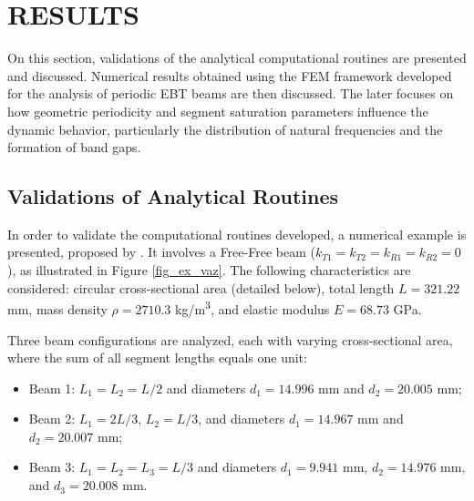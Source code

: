 \section{RESULTS}

On this section, validations of the analytical computational routines are presented and discussed. Numerical results obtained using the FEM framework developed for the analysis of periodic EBT beams are then discussed. The later focuses on how geometric periodicity and segment saturation parameters influence the dynamic behavior, particularly the distribution of natural frequencies and the formation of band gaps.

\subsection{Validations of Analytical Routines}

In order to validate the computational routines developed, a numerical example is presented, proposed by \textcite{vaz2008}. It involves a Free-Free beam ($k_{T1} = k_{T2} = k_{R1} = k_{R2} = 0$), as illustrated in Figure \ref{fig_ex_vaz}. The following characteristics are considered: circular cross-sectional area (detailed below), total length $L = 321.22$ mm, mass density $\rho = 2710.3$ kg/m\textsuperscript{3}, and elastic modulus $E = 68.73$ GPa.

Three beam configurations are analyzed, each with varying cross-sectional area, where the sum of all segment lengths equals one unit:
\begin{itemize}
    \item[\blacktriangleright] Beam 1: $L_1 = L_2 = L/2$ and diameters $d_1 = 14.996$ mm and $d_2 = 20.005$ mm;
    \item[\blacktriangleright] Beam 2: $L_1 = 2L/3$, $L_2 = L/3$, and diameters $d_1 = 14.967$ mm and $d_2 = 20.007$ mm;
    \item[\blacktriangleright] Beam 3: $L_1 = L_2 = L_3 = L/3$ and diameters $d_1 = 9.941$ mm, $d_2 = 14.976$ mm, and $d_3 = 20.008$ mm.
\end{itemize}

